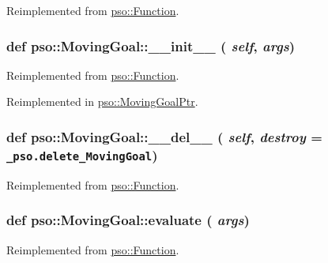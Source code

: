 Reimplemented from \hyperlink{classpso_1_1Function_959f07a6de4f333461fdb0261e6c25ae}{pso::Function}.\hypertarget{classpso_1_1MovingGoal_cc887e0a1449493e7497703a3c6633f3}{
\subsubsection{\setlength{\rightskip}{0pt plus 5cm}def pso::MovingGoal::\_\-\_\-init\_\-\_\- ( {\em self}, \/   {\em args})}}
\label{classpso_1_1MovingGoal_cc887e0a1449493e7497703a3c6633f3}




Reimplemented from \hyperlink{classpso_1_1Function_6874097c6476dc85af64b40e76a807e9}{pso::Function}.

Reimplemented in \hyperlink{classpso_1_1MovingGoalPtr_b48d8f3578706bbddfb9110c88acc239}{pso::MovingGoalPtr}.\hypertarget{classpso_1_1MovingGoal_ccd203604cd67870527b7b16d0be7564}{
\subsubsection{\setlength{\rightskip}{0pt plus 5cm}def pso::MovingGoal::\_\-\_\-del\_\-\_\- ( {\em self}, \/   {\em destroy} = {\tt \_\-pso.delete\_\-MovingGoal})}}
\label{classpso_1_1MovingGoal_ccd203604cd67870527b7b16d0be7564}




Reimplemented from \hyperlink{classpso_1_1Function_c80bd40fcf4a956e5732ed099bccc598}{pso::Function}.\hypertarget{classpso_1_1MovingGoal_16ffa8c492ff6f56ed8fcbf20f168bdd}{
\subsubsection{\setlength{\rightskip}{0pt plus 5cm}def pso::MovingGoal::evaluate ( {\em args})}}
\label{classpso_1_1MovingGoal_16ffa8c492ff6f56ed8fcbf20f168bdd}




Reimplemented from \hyperlink{classpso_1_1Function_7c958ea6d942a89ae219b872b4d73541}{pso::Function}.

